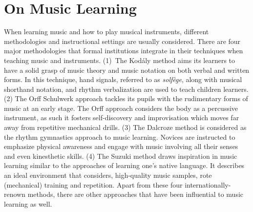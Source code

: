 \documentclass[sigconf, screen, review]{acmart}
\begin{document}
\section{On Music Learning}
When learning music and how to play musical instruments, different methodologies and instructional settings are usually considered. There are four major methodologies that formal institutions integrate in their techniques when teaching music and instruments. %
(1)~The Kodály method \cite{choksy1974kodaly} aims its learners to have a solid grasp of music theory and music notation on both verbal and written forms. In this technique, hand signals, referred to as \textit{solfège}, along with musical shorthand notation, and rhythm verbalization are used to teach children learners. (2) The Orff Schulwerk \cite{shamrock1997orff} approach tackles its pupils with the rudimentary forms of music at an early stage. The Orff approach considers the body as a percussive instrument, as such it fosters self-discovery and improvisation which moves far away from repetitive mechanical drills. (3) The Dalcroze method \cite{mead1994dalcroze} is considered as the rhythm gymnastics approach to music learning. Novices are instructed to emphasize physical awareness and engage with music involving all their senses and even kinesthetic skills. (4) The Suzuki method \cite{peak1998suzuki} draws inspiration in music learning similar to the approaches of learning one's native language. It describes an ideal environment that considers, high-quality music samples, rote (mechanical) training and repetition. Apart from these four internationally-renown methods, there are other approaches that have been influential to music learning as well. 
\end{document}

